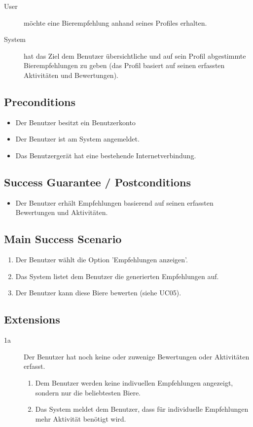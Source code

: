 \documentclass[10pt,a4paper]{scrartcl}
\begin{document}
\begin{description}
\item[User] möchte eine Bierempfehlung anhand seines Profiles erhalten.
\item[System] hat das Ziel dem Benutzer übersichtliche und auf sein Profil abgestimmte  Bierempfehlungen zu geben (das Profil basiert auf seinen erfassten Aktivitäten und Bewertungen).
\end{description}


\subsection*{Preconditions}

\begin{itemize}
\item Der Benutzer besitzt ein Benutzerkonto
\item Der Benutzer ist am System angemeldet.
\item Das Benutzergerät hat eine bestehende Internetverbindung.
\end{itemize}


\subsection*{Success Guarantee / Postconditions}
\begin{itemize}
\item Der Benutzer erhält Empfehlungen basierend auf seinen erfassten Bewertungen und Aktivitäten.
\end{itemize}


\subsection*{Main Success Scenario}

\begin{enumerate}
\item Der Benutzer wählt die Option 'Empfehlungen anzeigen'.
\item Das System listet dem Benutzer die generierten Empfehlungen auf.
\item Der Benutzer kann diese Biere bewerten (siehe UC05).
\end{enumerate}


\subsection*{Extensions}

\begin{description}
\item[1a] Der Benutzer hat noch keine oder zuwenige Bewertungen oder Aktivitäten erfasst.
	\begin{enumerate}
	\item Dem Benutzer werden keine indivuellen Empfehlungen angezeigt, sondern nur die beliebtesten Biere.
	\item Das System meldet dem Benutzer, dass für individuelle Empfehlungen mehr Aktivität benötigt wird.
	\end{enumerate}

\end{description}
\end{document}
